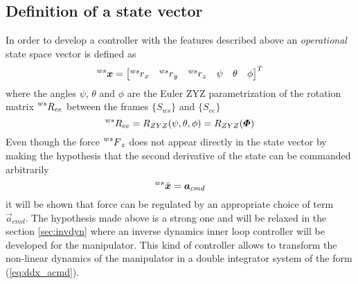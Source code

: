 \subsection{Definition of a state vector}
In order to develop a controller with the features described above
an \emph{operational} state space vector is defined as
\begin{equation}
  \label{eq:state_space}
  \prescript{ws}{}{\vec{x}} = 
  \begin{bmatrix}
    \prescript{ws}{} r_x & \prescript{ws}{} r_y & \prescript{ws}{}r_z & \psi & \theta & \phi
  \end{bmatrix}^T
\end{equation}
where the angles $\psi$, $\theta$ and $\phi$ are the Euler ZYZ parametrization of the rotation matrix
$\prescript{ws}{}{R}_{ee}$ between the frames $\{S_{ws}\}$ and $\{S_{ee}\}$
\[
\prescript{ws}{}{R}_{ee} = R_{ZYZ}(\psi, \theta, \phi) = R_{ZYZ}(\vec{\Phi})
\]
Even though the force $\prescript{ws}{} F_z$ does not appear directly in the state vector
by making the hypothesis that the second derivative of the state can be commanded arbitrarily
\begin{equation}\label{eq:ddx_acmd}
\prescript{ws}{}{\ddot{\vec{x}}} = \vec{a}_{cmd}
\end{equation}
it will be shown that force can be regulated by an appropriate choice of term $\vec{a}_{cmd}$.
The hypothesis made above is a strong one and will be relaxed in the section \ref{sec:invdyn}
where an inverse dynamics inner loop controller will be developed for the manipulator.
This kind of controller allows to transform the non-linear dynamics of the manipulator in a
double integrator system of the form (\ref{eq:ddx_acmd}).

